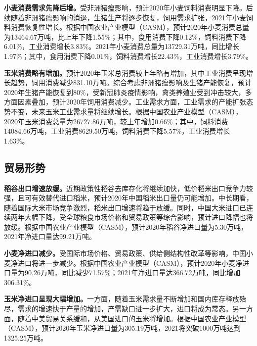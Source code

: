 \documentclass{progbookcn}
\begin{document}
\textbf{小麦消费需求先降后增。}受非洲猪瘟影响，预计2020年小麦饲料消费明显下降。后续随着非洲猪瘟影响的消退，生猪生产将逐步恢复，饲用需求扩张，2021年小麦饲料消费恢复性增长。根据中国农业产业模型（CASM），预计2020年小麦消费总量为13464.67万吨，比上年下降1.55\%；其中，食用消费下降0.12\%，饲料消费下降6.01\%，工业消费增长3.83\%。2021年小麦消费总量为13729.31万吨，同比增长1.97\%；其中，食用消费下降0.01\%，饲料消费增长22.43\%，工业消费增长3.79\%。

\textbf{玉米消费略有增加。}预计2020年玉米总消费较上年略有增加，其中工业消费呈现增长趋势，饲用消费减少831.10万吨。综合考虑非洲猪瘟影响及生猪产能恢复，预计2020年生猪产能恢复到80\%，受新冠肺炎疫情影响，禽类养殖业受到冲击较大，多方面因素叠加，预计2020年饲用消费减少。工业需求方面，工业需求的产能扩张态势不变，未来玉米工业需求量将继续增长。根据中国农业产业模型（CASM），2020年玉米消费总量为26727.86万吨，较上年增加0.66\%；其中，饲料消费14084.66万吨，工业消费8629.50万吨，饲料消费下降5.57\%，工业消费增长1.63\%。

\subsection{贸易形势}
\textbf{稻谷出口增速放缓。}近期政策性稻谷去库存化将继续加快，低价稻米出口竞争力较强，且可有效替代进口稻米，预计2020年中国稻米出口量仍可能增加。中长期看，随着国际大米市场竞争激烈，稻米出口增速将趋于放缓。同时，中国大米进口已连续两年大幅下降，受全球粮食市场价格和贸易政策等综合影响，预计进口降幅也将放缓。根据中国农业产业模型（CASM），预计2020年稻谷净进口量为5.30万吨，2021年净进口量达99.21万吨。

\textbf{小麦净进口减少。}受国际市场价格、贸易政策、供给侧结构性改革等影响，中国小麦净进口将进一步减少。根据中国农业产业模型（CASM），预计2020年小麦净进口量为90.26万吨，同比减少71.57\%；2021年净进口量达366.72万吨，同比增加306.31\%。

\textbf{玉米净进口呈现大幅增加。}一方面，随着玉米需求量不断增加和国内库存释放殆尽，需求的增速快于产量的增加，产需缺口进一步扩大，进口将成为常态。另一方面，随着中美贸易关系缓和，从美国进口的玉米将增加。根据中国农业产业模型（CASM），预计2020年玉米净进口量为305.19万吨，2021将突破1000万吨达到1325.25万吨。
\end{document}
